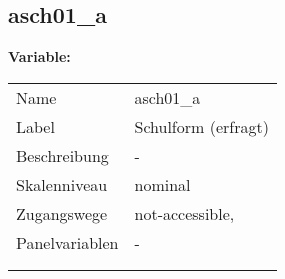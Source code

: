	
	
	\subsection{asch01\_a}
	\label{subSection:asch01_a}

	\noindent\textbf{Variable:}\\
		\begin{tabular}{lL{11.3cm}}
			\label{tableVariable:asch01_a}
			Name & asch01\_a \\
			Label & Schulform (erfragt) \\
			Beschreibung & - \\
			Skalenniveau & nominal \\
			Zugangswege &
				not-accessible,
 \\
			Panelvariablen & -
			 \\
			 \\
 \\
		\end{tabular}






	
	\newpage
